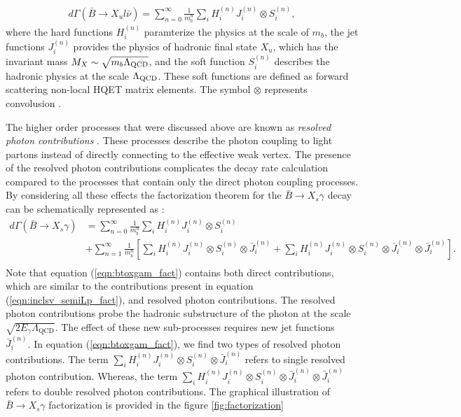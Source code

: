 \begin{eqnarray}\label{eqn:inclsv_semiLp_fact}
d \Gamma\left(\bar{B} \rightarrow X_{u} l \bar{\nu}\right)=\sum_{n=0}^{\infty} \frac{1}{m_{b}^{n}} \sum_{i} H_{i}^{(n)} J_{i}^{(n)} \otimes S_{i}^{(n)},
\end{eqnarray}
where the hard functions $H_i^{(n)}$ paramterize the physics at the scale of $m_b$, the jet functions $J_i^{(n)}$ provides the physics of hadronic final state $X_u$, which has the invariant mass $M_X\sim \sqrt{m_b\Lambda_{\rm{QCD}}}$, and the soft function $S_i^{(n)}$ describes the hadronic physics at the scale $\Lambda_{\rm{QCD}}$. These soft functions are defined as forward scattering non-local HQET matrix elements. The symbol $\otimes$ represents convolusion \cite{Benzke:2010js}.\par
The higher order processes that were discussed above are known as \textit{resolved photon contributions} \cite{Benzke:2010js}. These processes describe the photon coupling to light partons instead of directly connecting to the effective weak vertex. The presence of the resolved photon contributions complicates the decay rate calculation compared to the processes that contain only the direct photon coupling processes. By considering all these effects the factorization theorem for the $\bar{B}\rightarrow X_s\gamma$ decay can be schematically represented as \cite{Benzke:2010js}:
\begin{align}\label{eqn:btoxgam_fact}
d \Gamma\left(\bar{B} \rightarrow X_{s} \gamma\right) &=\sum_{n=0}^{\infty} \frac{1}{m_{b}^{n}} \sum_{i} H_{i}^{(n)} J_{i}^{(n)} \otimes S_{i}^{(n)}\nonumber\\
&+\sum_{n=1}^{\infty} \frac{1}{m_{b}^{n}}\left[\sum_{i} H_{i}^{(n)} J_{i}^{(n)} \otimes S_{i}^{(n)} \otimes \bar{J}_{i}^{(n)}+\sum_{i} H_{i}^{(n)} J_{i}^{(n)} \otimes S_{i}^{(n)} \otimes \bar{J}_{i}^{(n)} \otimes \bar{J}_{i}^{(n)}\right].\nonumber\\
\end{align}
Note that equation (\ref{eqn:btoxgam_fact}) contains both direct contributions, which are similar to the contributions present in equation (\ref{eqn:inclsv_semiLp_fact}), and resolved photon contributions. The resolved photon contributions probe the hadronic substructure of the photon at the scale $\sqrt{2 E_{\gamma} \Lambda_{\mathrm{QCD}}}$. The effect of these new sub-processes requires new jet functions $\bar{J}_i^{(n)}$. In equation (\ref{eqn:btoxgam_fact}), we find two types of resolved photon contributions. The term $\sum_{i} H_{i}^{(n)} J_{i}^{(n)} \otimes S_{i}^{(n)} \otimes \bar{J}_{i}^{(n)}$ refers to single resolved photon contribution. Whereas, the term $\sum_{i} H_{i}^{(n)} J_{i}^{(n)} \otimes S_{i}^{(n)} \otimes \bar{J}_{i}^{(n)} \otimes \bar{J}_{i}^{(n)}$ refers to double resolved photon contributions. The graphical illustration of $\bar{B}\rightarrow X_s\gamma$ factorization is provided in the figure \ref{fig:factorization}
